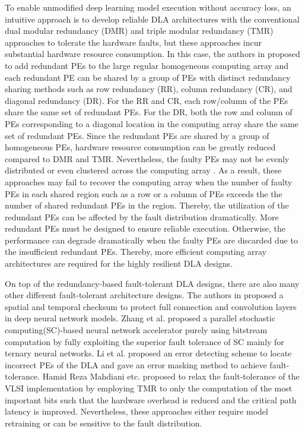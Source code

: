 To enable unmodified deep learning model execution without accuracy loss, an intuitive approach is to develop reliable DLA architectures with the conventional dual modular redundancy (DMR) and triple modular redundancy (TMR) approaches to tolerate the hardware faults, but these approaches incur substantial hardware resource consumption. In this case, the authors in \cite{takanami2017built}\cite{takanami2012built}\cite{horita2000fault} proposed to add redundant PEs to the large regular homogeneous computing array and each redundant PE can be shared by a group of PEs with distinct redundancy sharing methods such as row redundancy (RR), column redundancy (CR), and diagonal redundancy (DR). For the RR and CR, each row/column of the PEs share the same set of redundant PEs. For the DR, both the row and column of PEs corresponding to a diagonal location in the computing array share the same set of redundant PEs. Since the redundant PEs are shared by a group of homogeneous PEs, hardware resource consumption can be greatly reduced compared to DMR and TMR. Nevertheless, the faulty PEs may not be evenly distributed or even clustered across the computing array \cite{stapper1983integrated}. As a result, these approaches may fail to recover the computing array when the number of faulty PEs in each shared region such as a row or a column of PEs exceeds the the number of shared redundant PEs in the region. Thereby, the utilization of the redundant PEs can be affected by the fault distribution dramatically. More redundant PEs must be designed to ensure reliable execution. Otherwise, the performance can degrade dramatically when the faulty PEs are discarded due to the insufficient redundant PEs. Thereby, more efficient computing array architectures are required for the highly resilient DLA designs. 

On top of the redundancy-based fault-tolerant DLA designs, there are also many other different fault-tolerant architecture designs. The authors in \cite{ozen2019sanity} \cite{zhao2020algorithm} proposed a spatial and temporal checksum to protect full connection and convolution layers in deep neural network models. Zhang et al. \cite{zhang2020sorting} proposed a parallel stochastic computing(SC)-based neural network accelerator purely using bitstream computation by fully exploiting the superior fault tolerance of SC mainly for ternary neural networks. Li et al. \cite{li2020soft} proposed an error detecting scheme to locate incorrect PEs of the DLA and gave an error masking method to achieve fault-tolerance. Hamid Reza Mahdiani etc. \cite{mahdiani2012relaxed} proposed to relax the fault-tolerance of the VLSI implementation by employing TMR to only the computation of the most important bits such that the hardware overhead is reduced and the critical path latency is improved. Nevertheless, these approaches either require model retraining or can be sensitive to the fault distribution.


